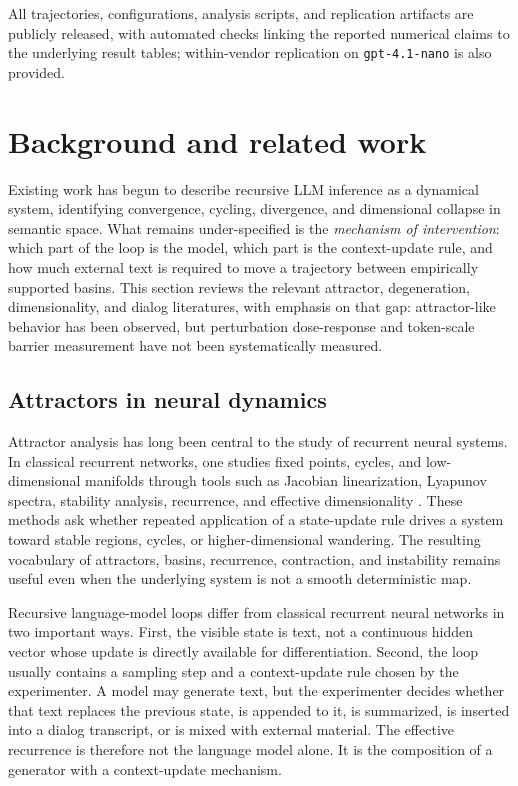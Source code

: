\documentclass{article}
\theoremstyle{plain}
\theoremstyle{definition}
\begin{document}
All trajectories, configurations, analysis scripts, and replication artifacts are publicly released, with automated checks linking the reported numerical claims to the underlying result tables; within-vendor replication on \texttt{gpt-4.1-nano} is also provided.

\section{Background and related work}

Existing work has begun to describe recursive LLM inference as a dynamical system, identifying convergence, cycling, divergence, and dimensional collapse in semantic space. What remains under-specified is the \textit{mechanism of intervention}: which part of the loop is the model, which part is the context-update rule, and how much external text is required to move a trajectory between empirically supported basins. This section reviews the relevant attractor, degeneration, dimensionality, and dialog literatures, with emphasis on that gap: attractor-like behavior has been observed, but perturbation dose-response and token-scale barrier measurement have not been systematically measured.

\subsection{Attractors in neural dynamics}

Attractor analysis has long been central to the study of recurrent neural systems. In classical recurrent networks, one studies fixed points, cycles, and low-dimensional manifolds through tools such as Jacobian linearization, Lyapunov spectra, stability analysis, recurrence, and effective dimensionality \citep{hopfield1982,sussillo2013,maheswaranathan2019}. These methods ask whether repeated application of a state-update rule drives a system toward stable regions, cycles, or higher-dimensional wandering. The resulting vocabulary of attractors, basins, recurrence, contraction, and instability remains useful even when the underlying system is not a smooth deterministic map.

Recursive language-model loops differ from classical recurrent neural networks in two important ways. First, the visible state is text, not a continuous hidden vector whose update is directly available for differentiation. Second, the loop usually contains a sampling step and a context-update rule chosen by the experimenter. A model may generate text, but the experimenter decides whether that text replaces the previous state, is appended to it, is summarized, is inserted into a dialog transcript, or is mixed with external material. The effective recurrence is therefore not the language model alone. It is the composition of a generator with a context-update mechanism.
\end{document}
